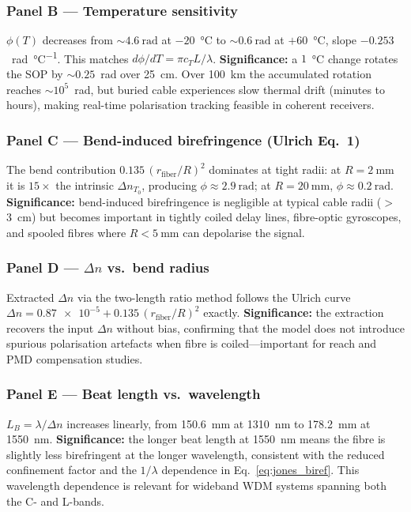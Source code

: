 ﻿\documentclass[11pt,a4paper]{article}
\begin{document}
\subsubsection*{Panel B --- Temperature sensitivity}
$\phi(T)$ decreases from $\sim\!\SI{4.6}{\radian}$ at $-20$~\si{\celsius}
to $\sim\!\SI{0.6}{\radian}$ at $+60$~\si{\celsius}, slope
$-0.253$~\si{\radian\per\celsius}.  This matches $d\phi/dT = \pi c_T
L/\lambda$.  \textbf{Significance:} a $1$~\si{\celsius} change rotates the
SOP by $\sim\!0.25$~rad over 25~cm.  Over 100~km the accumulated rotation
reaches $\sim\!10^5$~rad, but buried cable experiences slow thermal drift
(minutes to hours), making real-time polarisation tracking feasible in
coherent receivers.

\subsubsection*{Panel C --- Bend-induced birefringence (Ulrich Eq.~1)}
The bend contribution $0.135\,(r_\text{fiber}/R)^2$ dominates at tight
radii: at $R = \SI{2}{\mm}$ it is $15\times$ the intrinsic
$\Delta n_{T_0}$, producing $\phi \approx \SI{2.9}{\radian}$; at
$R = \SI{20}{\mm}$, $\phi \approx \SI{0.2}{\radian}$.  \textbf{Significance:}
bend-induced birefringence is negligible at typical cable radii
($>$\SI{3}{\cm}) but becomes important in tightly coiled delay lines,
fibre-optic gyroscopes, and spooled fibres where $R < \SI{5}{\mm}$ can
depolarise the signal.

\subsubsection*{Panel D --- $\Delta n$ vs.\ bend radius}
Extracted $\Delta n$ via the two-length ratio method follows the Ulrich
curve $\Delta n = \num{0.87e-5} + 0.135\,(r_\text{fiber}/R)^2$ exactly.
\textbf{Significance:} the extraction recovers the input $\Delta n$ without
bias, confirming that the model does not introduce spurious polarisation
artefacts when fibre is coiled---important for reach and PMD compensation
studies.

\subsubsection*{Panel E --- Beat length vs.\ wavelength}
$L_B = \lambda / \Delta n$ increases linearly, from
\SI{150.6}{\mm} at 1310~nm to \SI{178.2}{\mm} at 1550~nm.
\textbf{Significance:} the longer beat length at 1550~nm means the fibre is
slightly less birefringent at the longer wavelength, consistent with the
reduced confinement factor and the $1/\lambda$ dependence in
Eq.~\eqref{eq:jones_biref}.  This wavelength dependence is relevant for
wideband WDM systems spanning both the C- and L-bands.
\end{document}
